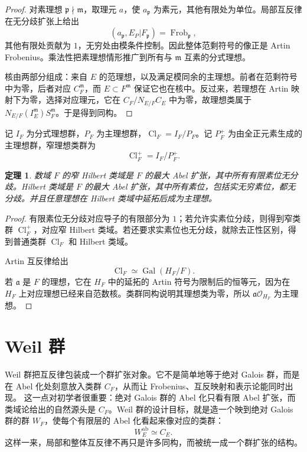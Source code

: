 \documentclass[11pt,a4paper,openany]{ctexbook}
\numberwithin{equation}{chapter}
\newcommand{\Gal}{\operatorname{Gal}}
\newcommand{\Cl}{\operatorname{Cl}}
\newcommand{\Frob}{\operatorname{Frob}}
\theoremstyle{plain}
\newtheorem{theorem}{定理}[chapter]
\theoremstyle{definition}
\theoremstyle{remark}
\begin{document}
\begin{proof}
对素理想 $\mathfrak p\nmid\mathfrak m$，取理元 $a$，使 $a_{\mathfrak p}$ 为素元，其他有限处为单位。局部互反律在无分歧扩张上给出
\[
(a_{\mathfrak p},E_P|F_{\mathfrak p})=\Frob_{\mathfrak p},
\]
其他有限处贡献为 $1$，无穷处由模条件控制。因此整体范剩符号的像正是 Artin Frobenius。乘法性把素理想情形推广到所有与 $\mathfrak m$ 互素的分式理想。

核由两部分组成：来自 $E$ 的范理想，以及满足模同余的主理想。前者在范剩符号中为零，后者对应 $C_F^{\mathfrak m}$，而 $E\subset F^{\mathfrak m}$ 保证它也在核中。反过来，若理想在 Artin 映射下为零，选择对应理元，它在 $C_F/N_{E/F}C_E$ 中为零，故理想类属于 $N_{E/F}(I_E^{\mathfrak m})S_F^{\mathfrak m}$。于是得到同构。
\end{proof}

记 $I_F$ 为分式理想群，$P_F$ 为主理想群，$\Cl_F=I_F/P_F$。记 $P_F^+$ 为由全正元素生成的主理想群，窄理想类群为
\[
\Cl_F^+=I_F/P_F^+.
\]

\begin{theorem}
数域 $F$ 的窄 Hilbert 类域是 $F$ 的最大 Abel 扩张，其中所有有限素位无分歧。Hilbert 类域是 $F$ 的最大 Abel 扩张，其中所有素位，包括实无穷素位，都无分歧。并且任意理想在 Hilbert 类域中延拓后成为主理想。
\end{theorem}

\begin{proof}
有限素位无分歧对应导子的有限部分为 $1$；若允许实素位分歧，则得到窄类群 $\Cl_F^+$，对应窄 Hilbert 类域。若还要求实素位也无分歧，就除去正性区别，得到普通类群 $\Cl_F$ 和 Hilbert 类域。

Artin 互反律给出
\[
\Cl_F\simeq \Gal(H_F/F).
\]
若 $\mathfrak a$ 是 $F$ 的理想，它在 $H_F$ 中的延拓的 Artin 符号为限制后的恒等元，因为在 $H_F$ 上对应理想已经来自范数核。类群同构说明其理想类为零，所以 $\mathfrak a\mathcal O_{H_F}$ 为主理想。
\end{proof}

\section{Weil 群}

Weil 群把互反律包装成一个群扩张对象。它不是简单地等于绝对 Galois 群，而是在 Abel 化处刻意放入类群 $C_F$，从而让 Frobenius、互反映射和表示论能同时出现。
这一点对初学者很重要：绝对 Galois 群的 Abel 化只看有限 Abel 扩张，而类域论给出的自然源头是 $C_F$。Weil 群的设计目标，就是造一个映到绝对 Galois 群的群 $W_F$，使每个有限层的 Abel 化看起来像对应的类群：
\[
W_E^{\operatorname{ab}}\simeq C_E.
\]
这样一来，局部和整体互反律不再只是许多同构，而被统一成一个群扩张的结构。
\end{document}
